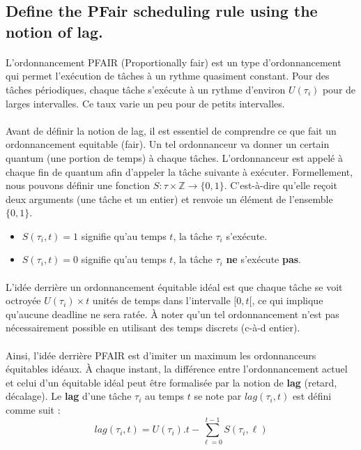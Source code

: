\subsection{Define the PFair scheduling rule using the notion of lag.}
\paragraph{}
L'ordonnancement PFAIR (Proportionally fair) est un type d'ordonnancement qui permet l'exécution de tâches à un rythme quasiment constant. Pour des tâches périodiques, chaque tâche s'exécute à un rythme d'environ $U(\tau_{i})$ pour de larges intervalles. Ce taux varie un peu pour de petits intervalles.

\paragraph{}
Avant de définir la notion de lag, il est essentiel de comprendre ce que fait un ordonnancement equitable (fair). 
Un tel ordonnanceur va donner un certain quantum (une portion de temps) à chaque tâches. L'ordonnanceur est appelé à chaque fin de quantum afin d'appeler la tâche suivante à exécuter. Formellement, nous pouvons définir une fonction $S : \tau \times \mathbb{Z} \rightarrow \{0, 1\}$. C'est-à-dire qu'elle reçoit deux arguments (une tâche et un entier) et renvoie un élément de l'ensemble $\{0, 1\}$.
\begin{itemize}
\item $S(\tau_{i}, t) = 1$ signifie qu'au temps $t$, la tâche $\tau_{i}$ s'exécute.
\item $S(\tau_{i}, t) = 0$ signifie qu'au temps $t$, la tâche $\tau_{i}$ \textbf{ne} s'exécute \textbf{pas}.
\end{itemize}

\paragraph{}
L'idée derrière un ordonnancement équitable idéal est que chaque tâche se voit octroyée $U(\tau_{i})\times t$ unités de temps dans l'intervalle $[0, t[$, ce qui implique qu'aucune deadline ne sera ratée. À noter qu'un tel ordonnancement n'est pas nécessairement possible en utilisant des temps discrets (c-à-d entier).

\paragraph{}
Ainsi, l'idée derrière PFAIR est d'imiter un maximum les ordonnanceurs équitables idéaux. À chaque instant, la différence entre l'ordonnancement actuel et celui d'un équitable idéal peut être formalisée par la notion de \textbf{lag} (retard, décalage). Le \textbf{lag} d'une tâche $\tau_{i}$ au temps $t$ se note par $lag(\tau_{i}, t)$ est défini comme suit :
\begin{equation}
lag(\tau_{i}, t) = U(\tau_{i}).t - \sum_{\ell = 0}^{t-1} S(\tau_{i}, \ell)
\end{equation}

